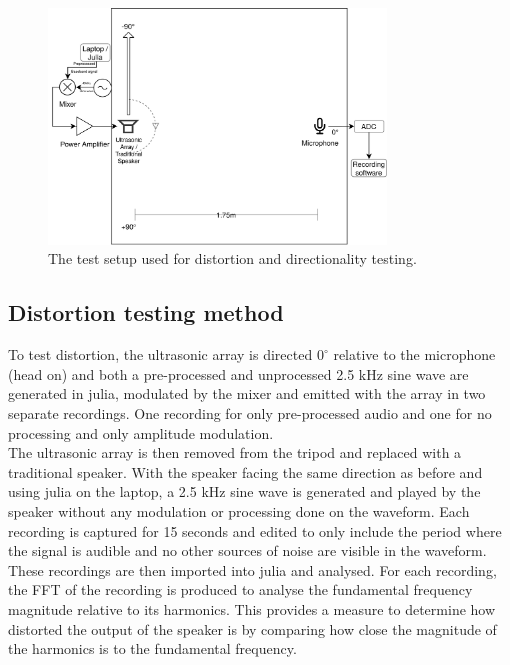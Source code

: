 \begin{figure}[ht!]
    \centering
    \includegraphics[width=0.8\textwidth]{Figures/Testing/Test_setup.png}
    \caption{The test setup used for distortion and directionality testing.}
    \label{fig:testsetup}
\end{figure}
\newpage
\subsection{Distortion testing method}
To test distortion, the ultrasonic array is directed  $0^\circ$ relative to the microphone (head on) and both a pre-processed and unprocessed 2.5 kHz sine wave are generated in julia, modulated by the mixer and emitted with the array in two separate recordings. One recording for only pre-processed audio and one for no processing and only amplitude modulation.\\
The ultrasonic array is then removed from the tripod and replaced with a traditional speaker. With the speaker facing the same direction as before and using julia on the laptop, a 2.5 kHz sine wave is generated and played by the speaker without any modulation or processing done on the waveform.
Each recording is captured for 15 seconds and edited to only include the period where the signal is audible and no other sources of noise are visible in the waveform.\\
These recordings are then imported into julia and analysed. For each recording, the FFT of the recording is produced to analyse the fundamental frequency magnitude relative to its harmonics. This provides a measure to determine how distorted the output of the speaker is by comparing how close the magnitude of the harmonics is to the fundamental frequency.

\newpage


